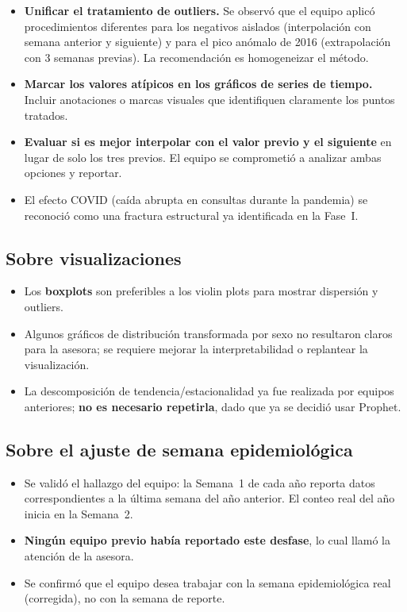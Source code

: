 \documentclass[11pt, a4paper]{article}
\begin{document}
\begin{itemize}[leftmargin=1.5em]
    \item \textbf{Unificar el tratamiento de outliers.} Se observó que el equipo aplicó procedimientos diferentes para los negativos aislados (interpolación con semana anterior y siguiente) y para el pico anómalo de 2016 (extrapolación con 3 semanas previas). La recomendación es homogeneizar el método.
    \item \textbf{Marcar los valores atípicos en los gráficos de series de tiempo.} Incluir anotaciones o marcas visuales que identifiquen claramente los puntos tratados.
    \item \textbf{Evaluar si es mejor interpolar con el valor previo y el siguiente} en lugar de solo los tres previos. El equipo se comprometió a analizar ambas opciones y reportar.
    \item El efecto COVID (caída abrupta en consultas durante la pandemia) se reconoció como una fractura estructural ya identificada en la Fase~I.
\end{itemize}

\subsection{Sobre visualizaciones}

\begin{itemize}[leftmargin=1.5em]
    \item Los \textbf{boxplots} son preferibles a los violin plots para mostrar dispersión y outliers.
    \item Algunos gráficos de distribución transformada por sexo no resultaron claros para la asesora; se requiere mejorar la interpretabilidad o replantear la visualización.
    \item La descomposición de tendencia/estacionalidad ya fue realizada por equipos anteriores; \textbf{no es necesario repetirla}, dado que ya se decidió usar Prophet.
\end{itemize}

\subsection{Sobre el ajuste de semana epidemiológica}

\begin{itemize}[leftmargin=1.5em]
    \item Se validó el hallazgo del equipo: la Semana~1 de cada año reporta datos correspondientes a la última semana del año anterior. El conteo real del año inicia en la Semana~2.
    \item \textbf{Ningún equipo previo había reportado este desfase}, lo cual llamó la atención de la asesora.
    \item Se confirmó que el equipo desea trabajar con la semana epidemiológica real (corregida), no con la semana de reporte.
\end{itemize}
\end{document}
